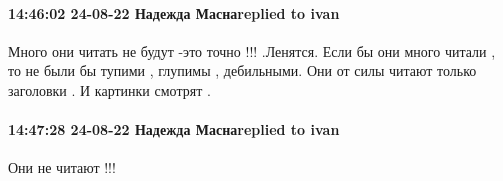  
 
 
 
 

\paragraph{14:46:02 24-08-22 Надежда Маснаreplied to ivan}

Много они читать не будут -это точно !!! .Ленятся. Если бы они много читали ,
то не были бы тупими , глупимы , дебильными. Они от силы читают только
заголовки . И картинки смотрят .

\paragraph{14:47:28 24-08-22 Надежда Маснаreplied to ivan}
Они не читают !!!
